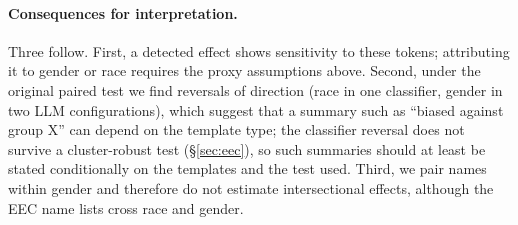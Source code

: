 \documentclass[runningheads]{llncs}
\begin{document}
\paragraph{Consequences for interpretation.} Three follow. First, a detected
effect shows sensitivity to these tokens; attributing it to gender or race
requires the proxy assumptions above. Second, under the original paired test we
find reversals of direction (race in one classifier, gender in two LLM
configurations), which suggest that a summary such as ``biased against group
X'' can depend on the template type; the classifier reversal does not survive a
cluster-robust test (\S\ref{sec:eec}), so such summaries should at least be
stated conditionally on the templates and the test used. Third, we
pair names within gender and therefore do not estimate intersectional effects,
although the EEC name lists cross race and gender.

\end{document}
